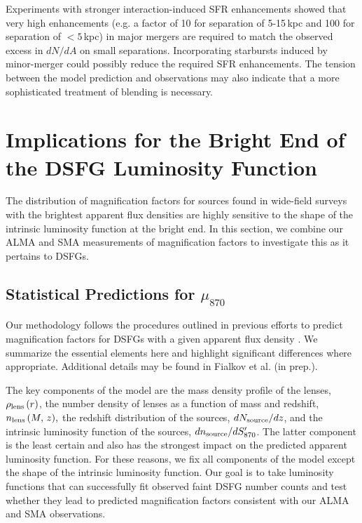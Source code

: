 \documentclass[iop]{emulateapj}
\begin{document}
Experiments with stronger interaction-induced SFR enhancements showed that very
high enhancements (e.g. a factor of 10 for separation of 5-15$\,$kpc and 100 for
separation of $<5\,$kpc) in major mergers are required to match the observed
excess in $dN/dA$ on small separations. Incorporating starbursts induced by
minor-merger could possibly reduce the required SFR enhancements. The tension
between the model prediction and observations may also indicate that a more
sophisticated treatment of blending is necessary.



\section{Implications for the Bright End of the DSFG Luminosity
Function}\label{sec:discuss}

The distribution of magnification factors for sources found in wide-field
surveys with the brightest apparent flux densities are highly sensitive to the
shape of the intrinsic luminosity function at the bright end.  In this section,
we combine our ALMA and SMA measurements of magnification factors to investigate
this as it pertains to DSFGs.

\subsection{Statistical Predictions for $\mu_{870}$}\label{sec:statpredict}

Our methodology follows the procedures outlined in previous efforts to predict
magnification factors for DSFGs with a given apparent flux density
\citep[chiefly,][]{Lima:2010fk, Wardlow:2013lr}.  We summarize the essential
elements here and highlight significant differences where appropriate.
Additional details may be found in Fialkov et al. (in prep.).  

The key components of the model are the mass density profile of the lenses,
$\rho_{\rm lens}\,(r)$, the number density of lenses as a function of mass and
redshift, $n_{\rm lens}\,(M, \, z),$ the redshift distribution of the sources,
$dN_{\rm source}/dz$, and the intrinsic luminosity function of the sources,
$dn_{\rm source}/dS_{870}^\prime$.  The latter component is the least certain
and also has the strongest impact on the predicted apparent luminosity
function.  For these reasons, we fix all components of the model except the
shape of the intrinsic luminosity function.  Our goal is to take luminosity
functions that can successfully fit observed faint DSFG number counts
\citep{Karim:2013lr} and test whether they lead to predicted magnification
factors consistent with our ALMA and SMA observations.
\end{document}
